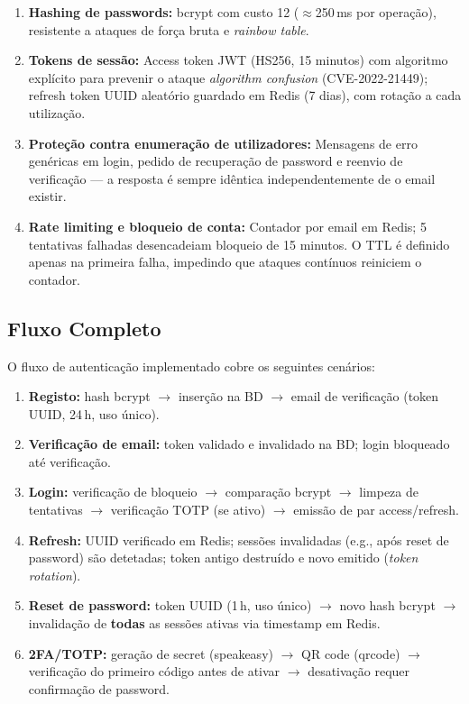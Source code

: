 \begin{enumerate}
    \item \textbf{Hashing de passwords:} bcrypt com custo 12 ($\approx$250\,ms por operação), resistente a ataques de força bruta e \textit{rainbow table}.
    \item \textbf{Tokens de sessão:} Access token \ac{JWT} (HS256, 15 minutos) com algoritmo explícito para prevenir o ataque \textit{algorithm confusion} (CVE-2022-21449); refresh token UUID aleatório guardado em Redis (7 dias), com rotação a cada utilização.
    \item \textbf{Proteção contra enumeração de utilizadores:} Mensagens de erro genéricas em login, pedido de recuperação de password e reenvio de verificação — a resposta é sempre idêntica independentemente de o email existir.
    \item \textbf{Rate limiting e bloqueio de conta:} Contador por email em Redis; 5 tentativas falhadas desencadeiam bloqueio de 15 minutos. O TTL é definido apenas na primeira falha, impedindo que ataques contínuos reiniciem o contador.
\end{enumerate}

\subsection{Fluxo Completo}

O fluxo de autenticação implementado cobre os seguintes cenários:

\begin{enumerate}
    \item \textbf{Registo:} hash bcrypt $\rightarrow$ inserção na BD $\rightarrow$ email de verificação (token UUID, 24\,h, uso único).
    \item \textbf{Verificação de email:} token validado e invalidado na BD; login bloqueado até verificação.
    \item \textbf{Login:} verificação de bloqueio $\rightarrow$ comparação bcrypt $\rightarrow$ limpeza de tentativas $\rightarrow$ verificação TOTP (se ativo) $\rightarrow$ emissão de par access/refresh.
    \item \textbf{Refresh:} UUID verificado em Redis; sessões invalidadas (e.g., após reset de password) são detetadas; token antigo destruído e novo emitido (\textit{token rotation}).
    \item \textbf{Reset de password:} token UUID (1\,h, uso único) $\rightarrow$ novo hash bcrypt $\rightarrow$ invalidação de \textbf{todas} as sessões ativas via timestamp em Redis.
    \item \textbf{2FA/TOTP:} geração de secret (speakeasy) $\rightarrow$ QR code (qrcode) $\rightarrow$ verificação do primeiro código antes de ativar $\rightarrow$ desativação requer confirmação de password.
\end{enumerate}

